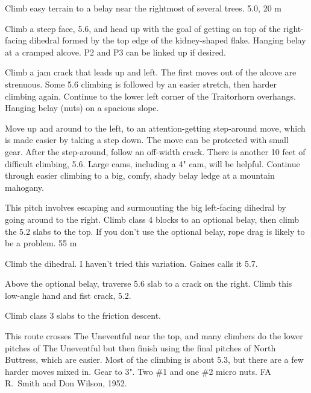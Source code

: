 \documentclass{tahquitz}
\begin{document}
 Climb easy terrain to a belay near the rightmost of several trees. 5.0, 20 m

 Climb a steep face, 5.6, and
head up with the goal of getting on top of the right-facing
dihedral formed by the top edge of the kidney-shaped flake. Hanging belay at a
cramped alcove. P2 and P3 can be linked up if desired.

 Climb a jam crack that leads up and left. The first moves
out of the alcove are strenuous. Some 5.6 climbing is followed by an
easier stretch, then harder climbing again.  Continue to the lower
left corner of the Traitorhorn overhangs. Hanging belay (nuts) on a spacious
slope.

 Move up and around to the left, to an attention-getting step-around move,
which is made easier by taking a step down. The move can be protected with small
gear. After the step-around, follow an off-width crack.
There is another 10 feet of difficult climbing, 5.6. Large cams, including a 4" cam,
will be helpful. 
Continue through easier climbing to a big, comfy, shady belay ledge at a mountain mahogany.

 This pitch involves escaping and surmounting the big left-facing dihedral by
going around to the right. Climb class 4 blocks to an optional belay, then climb the 5.2
slabs to the top. If you don't use the optional belay, rope drag is likely to be a problem. 55 m

 Climb the dihedral. I haven't tried this variation. Gaines calls it 5.7.

 Above the optional belay, traverse 5.6 slab to a crack
on the right.  Climb this low-angle hand and fist crack, 5.2.

Climb class 3 slabs to the friction descent.





This route crosses The Uneventful near the top, and many climbers do the lower
pitches of The Uneventful but then finish using the final pitches of
North Buttress, which are easier. Most of the climbing is about 5.3,
but there are a few harder moves mixed in. Gear to 3". Two \#1 and one \#2 micro nuts.
FA R.~Smith and Don Wilson, 1952.
\end{document}
